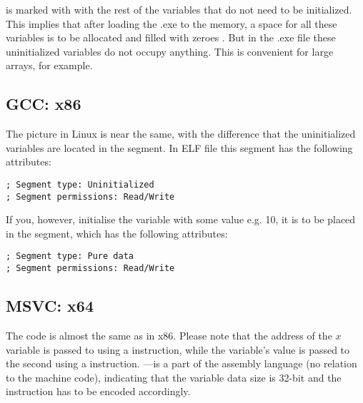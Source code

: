 is marked with  with the rest of the variables that do not need to be initialized. 
This implies that after loading the .exe to the memory, a space for all these variables is to be 
allocated and filled with zeroes \cite[6.7.8p10]{C99TC3}. 
But in the .exe file these uninitialized variables do not occupy anything.
This is convenient for large arrays, for example.



\subsection{GCC: x86}

The picture in Linux is near the same, with the difference that the uninitialized variables are located in the  segment. 
In \ac{ELF} file this segment has the following attributes:

\begin{lstlisting}
; Segment type: Uninitialized
; Segment permissions: Read/Write
\end{lstlisting}

If you, however, initialise the variable with some value e.g. 10, 
it is to be placed in the  segment, which has the following attributes:

\begin{lstlisting}
; Segment type: Pure data
; Segment permissions: Read/Write
\end{lstlisting}

\subsection{MSVC: x64}



The code is almost the same as in x86.
Please note that the address of the $x$ variable is passed to  using a \LEA instruction,
while the variable's value is passed to the second \printf using a \MOV instruction.
---is a part of the assembly language (no relation to the machine code),
indicating that the variable data size is 32-bit and the \MOV instruction has to be encoded accordingly.

